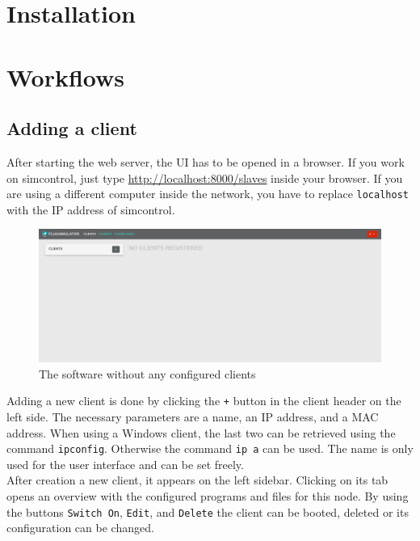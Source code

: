 \documentclass[accentcolor=tud1a, paper=a4, colorback]{tudreport}
\newcommand{\ind}[1]{#1\index{#1}}
\begin{document}
	\chapter{Installation}


	\chapter{Workflows}
	\section{Adding a client}
	After starting the web server, the UI has to be opened in a browser.
	If you work on \ind{simcontrol}, just type \url{http://localhost:8000/slaves} inside
	your browser. If you are using a different computer inside the network, you
	have to replace \texttt{localhost} with the IP address of simcontrol.
	\\
	\begin{figure}[h]
		\centering
		\includegraphics[width=.9\textwidth]{empty_startpage}
		\caption{The software without any configured clients}
		\label{empty_startpage}
	\end{figure}
	Adding a new client is done by clicking the \texttt{+} button in the
	client header on the left side.
	The necessary parameters are a name, an IP address,
	and a MAC address. When using a Windows client, the last two can be retrieved using
	the command \texttt{ipconfig}. Otherwise the command \texttt{ip a} can be used.
	The name is only used for the user interface
	and can be set freely.
	\\
	After creation a new client, it appears on the left sidebar. Clicking on its tab
	opens an overview with the configured programs and files for this node.
	By using the buttons \texttt{Switch On}, \texttt{Edit}, and \texttt{Delete}
	the client can be booted, deleted or its configuration can be changed.
\end{document}

